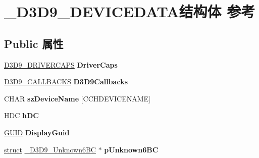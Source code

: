 \hypertarget{struct___d3_d9___d_e_v_i_c_e_d_a_t_a}{}\section{\+\_\+\+D3\+D9\+\_\+\+D\+E\+V\+I\+C\+E\+D\+A\+T\+A结构体 参考}
\label{struct___d3_d9___d_e_v_i_c_e_d_a_t_a}
\subsection*{Public 属性}
\begin{DoxyCompactItemize}
\item 
\mbox{\label{struct___d3_d9___d_e_v_i_c_e_d_a_t_a_a9a89fe6ab3bda691977ad238d1562ea5}} 
\hyperlink{struct___d3_d9___d_r_i_v_e_r_c_a_p_s}{D3\+D9\+\_\+\+D\+R\+I\+V\+E\+R\+C\+A\+PS} {\bfseries Driver\+Caps}
\item 
\mbox{\label{struct___d3_d9___d_e_v_i_c_e_d_a_t_a_a81dc7b6f0abf4dee70a00176c1c76d94}} 
\hyperlink{struct__tag_d3_d9___c_a_l_l_b_a_c_k_s}{D3\+D9\+\_\+\+C\+A\+L\+L\+B\+A\+C\+KS} {\bfseries D3\+D9\+Callbacks}
\item 
\mbox{\label{struct___d3_d9___d_e_v_i_c_e_d_a_t_a_accb3942086c69919e2e50abea954dd69}} 
C\+H\+AR {\bfseries sz\+Device\+Name} \mbox{[}C\+C\+H\+D\+E\+V\+I\+C\+E\+N\+A\+ME\mbox{]}
\item 
\mbox{\label{struct___d3_d9___d_e_v_i_c_e_d_a_t_a_a54531266840abec8e3117eafeda31427}} 
H\+DC {\bfseries h\+DC}
\item 
\mbox{\label{struct___d3_d9___d_e_v_i_c_e_d_a_t_a_a9fe2ae74f467e609234838a554f325d5}} 
\hyperlink{interface_g_u_i_d}{G\+U\+ID} {\bfseries Display\+Guid}
\item 
\mbox{\label{struct___d3_d9___d_e_v_i_c_e_d_a_t_a_a9c78e7e6a34c323c66dd8ce37d37f3d2}} 
\hyperlink{interfacestruct}{struct} \hyperlink{struct___d3_d9___unknown6_b_c}{\+\_\+\+D3\+D9\+\_\+\+Unknown6\+BC} $\ast$ {\bfseries p\+Unknown6\+BC}
\item 

\end{DoxyCompactItemize}
